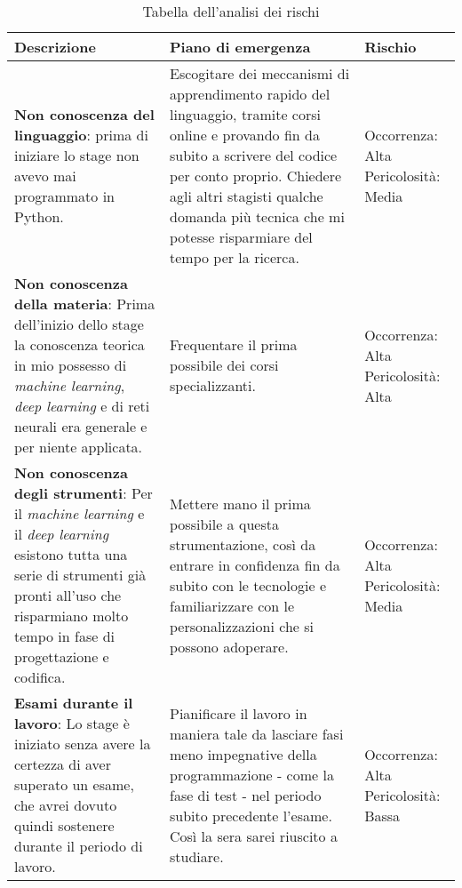 {
    \def\arraystretch{2}\tabcolsep=10pt
    
\begin{table}[H]
    \small
    \begin{tabular}{ |p{4.5cm} |p{4.5cm} |p{3cm}|}
        \hline
        \textbf{Descrizione} & \textbf{Piano di emergenza} & \textbf{Rischio} \\ \hline
        \textbf{Non conoscenza del linguaggio}: prima di iniziare lo stage non avevo mai programmato in Python. &
        Escogitare dei meccanismi di apprendimento rapido del linguaggio, tramite corsi online e provando fin da subito a scrivere del codice per conto proprio.
        \newline
        Chiedere agli altri stagisti qualche domanda più tecnica che mi potesse risparmiare del tempo per la ricerca. & 
        Occorrenza: Alta \newline Pericolosità: Media \\
        \hline
        
        \textbf{Non conoscenza della materia}: Prima dell'inizio dello stage la conoscenza teorica in mio possesso di \textit{machine learning}, \textit{deep learning} e di reti neurali era generale e per niente applicata. &
        Frequentare il prima possibile dei corsi specializzanti. &
        Occorrenza: Alta \newline Pericolosità: Alta \\ 
        \hline
        
        \textbf{Non conoscenza degli strumenti}: Per il \textit{machine learning} e il \textit{deep learning} esistono tutta una serie di strumenti già pronti all'uso che risparmiano molto tempo in fase di progettazione e codifica. &
        Mettere mano il prima possibile a questa strumentazione, così da entrare in confidenza fin da subito con le tecnologie e familiarizzare con le personalizzazioni che si possono adoperare. &
        Occorrenza: Alta \newline Pericolosità: Media \\
        \hline
        \textbf{Esami durante il lavoro}: Lo stage è iniziato senza avere la certezza di aver superato un esame, che avrei dovuto quindi sostenere durante il periodo di lavoro. &
        Pianificare il lavoro in maniera tale da lasciare fasi meno impegnative della programmazione - come la fase di test - nel periodo subito precedente l'esame. Così la sera sarei riuscito a studiare. &
        Occorrenza: Alta \newline Pericolosità: Bassa \\
        \hline
    \end{tabular}
    \caption{Tabella dell'analisi dei rischi}
\end{table}
}


